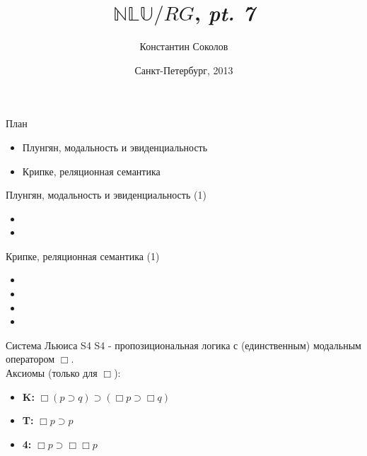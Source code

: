 \documentclass{beamer}
\begin{document}
\title{\huge{$\mathbb{NLU}/RG$, \textit{pt. 7}}}
\author{Константин Соколов}
\date{Санкт-Петербург, 2013} 
\begin{frame}
    \thispagestyle{empty}
    \titlepage
\end{frame}

\begin{frame}{План}
    \setcounter{framenumber}{1}
    \begin{itemize}
        \item Плунгян, модальность и эвиденциальность
        \item Крипке, реляционная семантика
    \end{itemize}
\end{frame}

\begin{frame}{Плунгян, модальность и эвиденциальность (1)}
\begin{itemize}
  \item 
  \item 
\end{itemize}
\end{frame}

\begin{frame}{Крипке, реляционная семантика (1)}
\begin{itemize}
  \item 
  \item 
  \item 
  \item 
\end{itemize}
\end{frame}

\begin{frame}{Система Льюиса S4}
S4 - пропозициональная логика с (единственным) модальным оператором $\Box$.\\
\bigskip
Аксиомы (только для $\Box$):
\begin{itemize}
  \item \textbf{K:} $\Box (p \supset q) \supset ( \Box p \supset \Box q)$
  \item \textbf{T:} $\Box p \supset p$
  \item \textbf{4:} $\Box p \supset \Box \Box p$
\end{itemize}
\end{frame}
\end{document}
